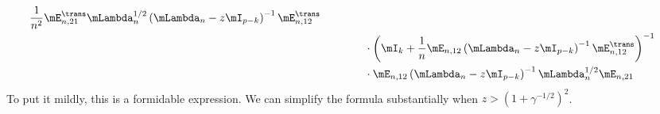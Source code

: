 \begin{align*}
\begin{split}
            \frac{1}{n^2}
            \mE_{n,21}^\trans
            \mLambda_{n}^{1/2}
            \left(
                \mLambda_n
                -
                z
                \mI_{p-k}
            \right)^{-1}
            \mE_{n,12}^\trans \\
            &\qquad\qquad\cdot
            \left(
                \mI_k
                +
                \frac{1}{n}
                \mE_{n,12}
                \left(
                    \mLambda_n
                    -
                    z
                    \mI_{p-k}
                \right)^{-1}
                \mE_{n,12}^\trans
            \right)^{-1} \\
            &\qquad\qquad\cdot
            \mE_{n,12}
            \left(
                \mLambda_n
                -
                z
                \mI_{p-k}
            \right)^{-1}
            \mLambda_{n}^{1/2}
            \mE_{n,21}
    \end{split}
\end{align*}
To put it mildly, this is a formidable expression.  We can simplify the formula substantially when $z > \left(1 + \gamma^{-1/2} \right)^2$.

